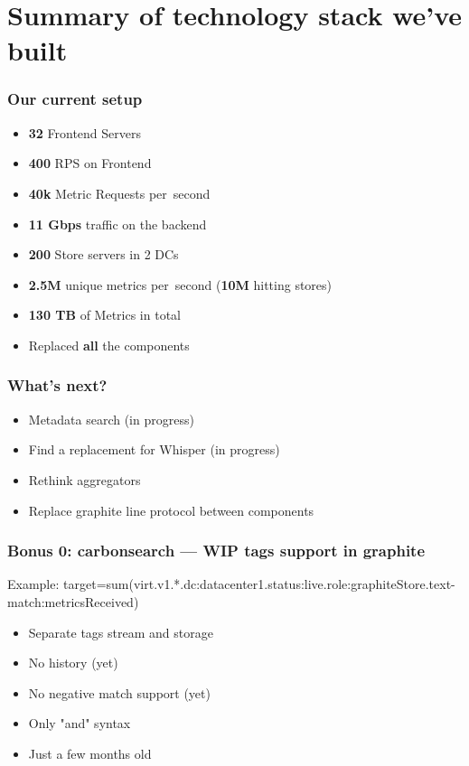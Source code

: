 \documentclass[aspectratio=43, unicode, notheorems, xcolor={dvipsnames}]{beamer}
\newcommand{\bs}[1]{\textbf{\textcolor{BookingBlue}{#1}}}
\begin{document}
\section{Summary of technology stack we've built}
\begin{frame}
	\frametitle{Our current setup}
	\Large{
	\begin{itemize}
		\item \bs{32} Frontend Servers
		\item \bs{400} RPS on Frontend
		\item \bs{40k} Metric Requests per~second
		\item \bs{11 Gbps} traffic on the backend
		\item \bs{200} Store servers in 2 DCs
		\item \bs{2.5M} unique metrics per~second (\bs{10M} hitting stores)
		\item \bs{130 TB} of Metrics in total
		\item Replaced \bs{all} the components
	\end{itemize}
	\vspace{2.5em}
	}
\end{frame}

\begin{frame}
	\frametitle{What's next?}
	\Large{
	\begin{itemize}
		\item Metadata search (in progress)
		\item Find a replacement for Whisper (in progress)
		\item Rethink aggregators
		\item Replace graphite line protocol between components
	\end{itemize}
	}
\end{frame}

\begin{frame}
	\frametitle{Bonus 0: carbonsearch --- WIP tags support in graphite}
	Example: target=sum(virt.v1.*.dc:datacenter1.status:live.role:graphiteStore.text-match:metricsReceived)

	\begin{itemize}
		\item Separate tags stream and storage
		\item No history (yet)
		\item No negative match support (yet)
		\item Only "and" syntax
		\item Just a few months old
	\end{itemize}
\end{frame}
\end{document}
